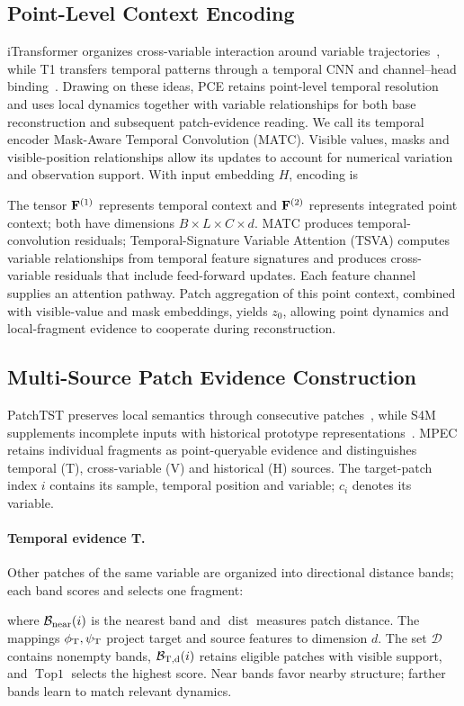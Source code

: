 \subsection{Point-Level Context Encoding}\label{sec:pce}
iTransformer organizes cross-variable interaction around variable trajectories~\citep{itransformer}, while T1 transfers temporal patterns through a temporal CNN and channel--head binding~\citep{t1}. Drawing on these ideas, PCE retains point-level temporal resolution and uses local dynamics together with variable relationships for both base reconstruction and subsequent patch-evidence reading. We call its temporal encoder Mask-Aware Temporal Convolution (MATC). Visible values, masks and visible-position relationships allow its updates to account for numerical variation and observation support. With input embedding $H$, encoding is

The tensor $\mathbf{F}^{(1)}$ represents temporal context and $\mathbf{F}^{(2)}$ represents integrated point context; both have dimensions $B\times L\times C\times d$. MATC produces temporal-convolution residuals; Temporal-Signature Variable Attention (TSVA) computes variable relationships from temporal feature signatures and produces cross-variable residuals that include feed-forward updates. Each feature channel supplies an attention pathway. Patch aggregation of this point context, combined with visible-value and mask embeddings, yields $z_0$, allowing point dynamics and local-fragment evidence to cooperate during reconstruction.

\subsection{Multi-Source Patch Evidence Construction}\label{sec:mpec}
PatchTST preserves local semantics through consecutive patches~\citep{patchtst}, while S4M supplements incomplete inputs with historical prototype representations~\citep{s4m}. MPEC retains individual fragments as point-queryable evidence and distinguishes temporal (T), cross-variable (V) and historical (H) sources. The target-patch index $i$ contains its sample, temporal position and variable; $c_i$ denotes its variable.

\paragraph{Temporal evidence T.}
Other patches of the same variable are organized into directional distance bands; each band scores and selects one fragment:

where $\mathcal B_{\rm near}(i)$ is the nearest band and $\operatorname{dist}$ measures patch distance. The mappings $\phi_{\rm T},\psi_{\rm T}$ project target and source features to dimension $d$. The set $\mathcal D$ contains nonempty bands, $\mathcal B_{\rm T,d}(i)$ retains eligible patches with visible support, and $\operatorname{Top1}$ selects the highest score. Near bands favor nearby structure; farther bands learn to match relevant dynamics.

